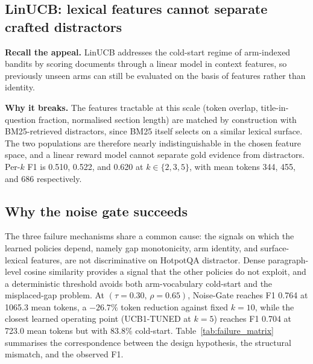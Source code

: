 \documentclass[runningheads]{llncs}
\begin{document}
\subsection{LinUCB: lexical features cannot separate crafted distractors}
\label{subsec:fail_linucb}

\textbf{Recall the appeal.} LinUCB addresses the cold-start regime of arm-indexed bandits by scoring documents through a linear model in context features, so previously unseen arms can still be evaluated on the basis of features rather than identity.

\textbf{Why it breaks.} The features tractable at this scale (token overlap, title-in-question fraction, normalised section length) are matched by construction with BM25-retrieved distractors, since BM25 itself selects on a similar lexical surface. The two populations are therefore nearly indistinguishable in the chosen feature space, and a linear reward model cannot separate gold evidence from distractors. Per-$k$ F1 is 0.510, 0.522, and 0.620 at $k\in\{2,3,5\}$, with mean tokens 344, 455, and 686 respectively.

\subsection{Why the noise gate succeeds}
\label{subsec:why_noise_gate}

The three failure mechanisms share a common cause: the signals on which the learned policies depend, namely gap monotonicity, arm identity, and surface-lexical features, are not discriminative on HotpotQA distractor. Dense paragraph-level cosine similarity provides a signal that the other policies do not exploit, and a deterministic threshold avoids both arm-vocabulary cold-start and the misplaced-gap problem. At $(\tau{=}0.30,\,\rho{=}0.65)$, Noise-Gate reaches F1 0.764 at 1065.3 mean tokens, a $-26.7\%$ token reduction against fixed $k{=}10$, while the closest learned operating point (UCB1-TUNED at $k{=}5$) reaches F1 0.704 at 723.0 mean tokens but with $83.8\%$ cold-start. Table~\ref{tab:failure_matrix} summarises the correspondence between the design hypothesis, the structural mismatch, and the observed F1.
\end{document}
